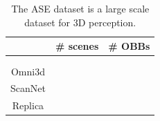 
\begin{table}[]
    \centering
    \begin{tabular}{c|c|c}
           & \# scenes & \# OBBs  \\ \hline
        \ASE{} &  & \\
        \ADT{} &  & \\
        Omni3d & & \\
        ScanNet & & \\
        Replica & & \\
    \end{tabular}
    \caption{The ASE dataset is a large scale dataset for 3D perception.}
    \label{tab:surf_datasets}
\end{table}